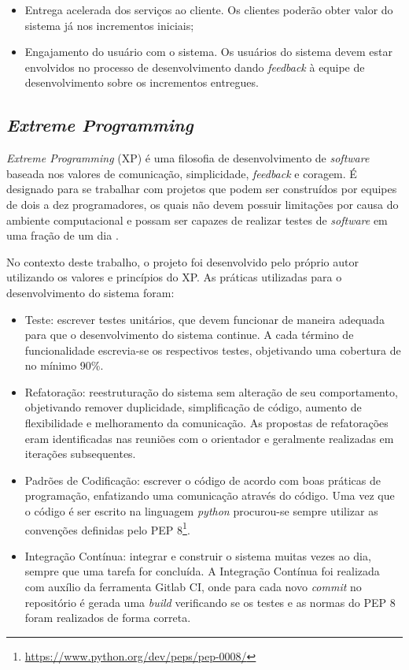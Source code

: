 \begin{itemize}
    \item Entrega acelerada dos serviços ao cliente. Os clientes poderão obter valor do sistema já nos incrementos iniciais;
    \item Engajamento do usuário com o sistema. Os usuários do sistema devem estar envolvidos no processo
    de desenvolvimento dando \textit{feedback} à equipe de desenvolvimento sobre os incrementos entregues.
\end{itemize}

    \subsection{\textit{Extreme Programming}}
    \textit{Extreme Programming} (XP) é uma filosofia de desenvolvimento de \textit{software} baseada nos valores de comunicação, simplicidade, \textit{feedback} e coragem. É designado para se trabalhar com projetos que podem ser
    construídos por equipes de dois a dez programadores, os quais não devem possuir limitações
    por causa do ambiente computacional e possam ser capazes de realizar testes de
    \textit{software} em uma fração de um dia \cite{beck_2004}.

    No contexto deste trabalho, o projeto foi desenvolvido pelo próprio autor utilizando os valores e princípios do XP. As práticas utilizadas para o desenvolvimento do sistema foram:

    \begin{itemize}
        \item Teste: escrever testes unitários, que devem funcionar de maneira adequada para que
        o desenvolvimento do sistema continue. A cada término de funcionalidade escrevia-se os respectivos testes, objetivando uma cobertura de no mínimo 90\%.
        \item Refatoração: reestruturação do sistema sem alteração de seu comportamento, objetivando
        remover duplicidade, simplificação de código, aumento de flexibilidade e melhoramento da comunicação. As propostas de refatorações eram identificadas nas reuniões com o orientador
        e geralmente realizadas em iterações subsequentes.
        \item Padrões de Codificação: escrever o código de acordo com boas práticas de programação, enfatizando uma comunicação através do código. Uma vez que o código é ser escrito na linguagem \textit{python}
        procurou-se sempre utilizar as convenções definidas pelo PEP 8\footnote{\url{https://www.python.org/dev/peps/pep-0008/}}.
        \item Integração Contínua: integrar e construir o sistema muitas vezes ao dia, sempre que uma tarefa
        for concluída. A Integração Contínua foi realizada com auxílio da ferramenta Gitlab CI, onde para cada novo \textit{commit} no repositório é gerada uma \textit{build} verificando se os testes e as normas do PEP 8 foram realizados de forma correta.
    \end{itemize}

